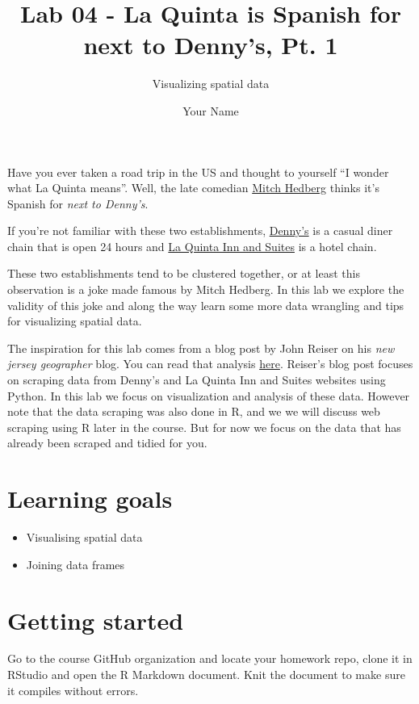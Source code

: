 \documentclass[
]{article}
\title{Lab 04 - La Quinta is Spanish for next to Denny's, Pt. 1}
\subtitle{Visualizing spatial data}
\author{Your Name}
\date{}
\providecommand{\tightlist}{%
  \setlength{\itemsep}{0pt}\setlength{\parskip}{0pt}}
\begin{document}
\maketitle

{
\setcounter{tocdepth}{2}
\tableofcontents
}
Have you ever taken a road trip in the US and thought to yourself ``I
wonder what La Quinta means''. Well, the late comedian
\href{https://en.wikipedia.org/wiki/Mitch_Hedberg}{Mitch Hedberg} thinks
it's Spanish for \emph{next to Denny's}.

If you're not familiar with these two establishments,
\href{https://www.dennys.com/}{Denny's} is a casual diner chain that is
open 24 hours and \href{http://www.lq.com/}{La Quinta Inn and Suites} is
a hotel chain.

These two establishments tend to be clustered together, or at least this
observation is a joke made famous by Mitch Hedberg. In this lab we
explore the validity of this joke and along the way learn some more data
wrangling and tips for visualizing spatial data.

The inspiration for this lab comes from a blog post by John Reiser on
his \emph{new jersey geographer} blog. You can read that analysis
\href{http://njgeo.org/2014/01/30/mitch-hedberg-and-gis/}{here}.
Reiser's blog post focuses on scraping data from Denny's and La Quinta
Inn and Suites websites using Python. In this lab we focus on
visualization and analysis of these data. However note that the data
scraping was also done in R, and we we will discuss web scraping using R
later in the course. But for now we focus on the data that has already
been scraped and tidied for you.

\section{Learning goals}\label{learning-goals}

\begin{itemize}
\tightlist
\item
  Visualising spatial data
\item
  Joining data frames
\end{itemize}

\section{Getting started}\label{getting-started}

Go to the course GitHub organization and locate your homework repo,
clone it in RStudio and open the R Markdown document. Knit the document
to make sure it compiles without errors.
\end{document}
